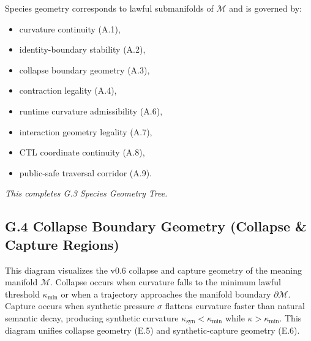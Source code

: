 \medskip

\noindent
Species geometry corresponds to lawful submanifolds of $\mathcal{M}$ and is
governed by:

\begin{itemize}
    \item curvature continuity (A.1),
    \item identity-boundary stability (A.2),
    \item collapse boundary geometry (A.3),
    \item contraction legality (A.4),
    \item runtime curvature admissibility (A.6),
    \item interaction geometry legality (A.7),
    \item CTL coordinate continuity (A.8),
    \item public-safe traversal corridor (A.9).
\end{itemize}

\medskip

\noindent
\textit{This completes G.3 Species Geometry Tree.}



\subsection*{G.4 Collapse Boundary Geometry (Collapse & Capture Regions)}

\noindent This diagram visualizes the v0.6 collapse and capture geometry of the
meaning manifold $\mathcal{M}$. Collapse occurs when curvature falls to the
minimum lawful threshold $\kappa_{\min}$ or when a trajectory approaches the
manifold boundary $\partial\mathcal{M}$. Capture occurs when synthetic pressure
$\sigma$ flattens curvature faster than natural semantic decay, producing
synthetic curvature $\kappa_{\mathrm{syn}} < \kappa_{\min}$ while
$\kappa > \kappa_{\min}$. This diagram unifies collapse geometry (E.5) and
synthetic‑capture geometry (E.6).

